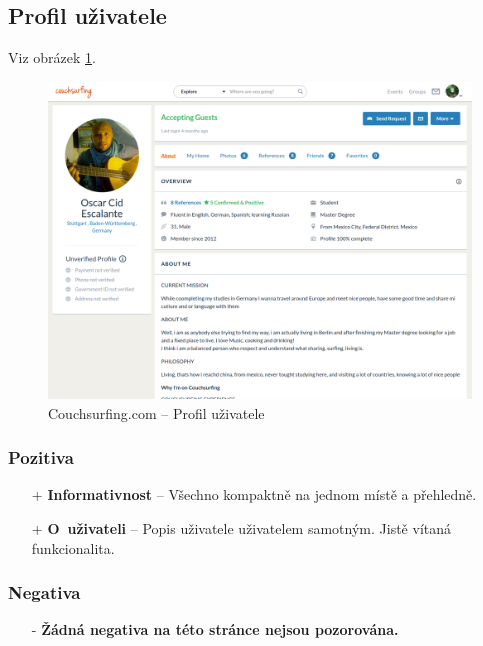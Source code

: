 
\newpage
\subsection{Profil uživatele}
Viz obrázek \ref{fig:couchsurfing:profile}.
\begin{figure}[h]
    \centering
    \includegraphics[width=1.0\textwidth]{media/couchsurfing/profile.png}
    \caption{Couchsurfing.com -- Profil uživatele}
    \label{fig:couchsurfing:profile}
\end{figure}
\subsubsection*{Pozitiva}
\begin{itemize}
    \item[+] \textbf{Informativnost} -- Všechno kompaktně na jednom místě a přehledně.
    \item[+] \textbf{O~uživateli} -- Popis uživatele uživatelem samotným. Jistě vítaná funkcionalita.
\end{itemize}
\subsubsection*{Negativa}
\begin{itemize}
    \item[-] \textbf{Žádná negativa na této stránce nejsou pozorována.}
\end{itemize}


